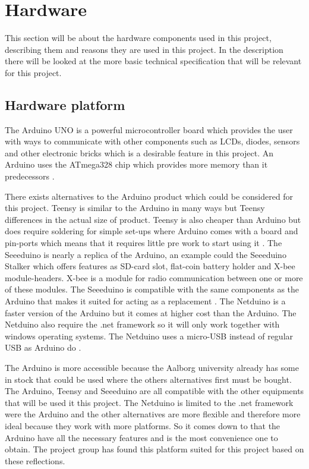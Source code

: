 \section{Hardware}
This section will be about the hardware components used in this project, describing them and reasons they are used in this project. In the description there will be looked at the more basic technical specification that will be relevant for this project.

\subsection{Hardware platform}
The Arduino UNO is a powerful microcontroller board which provides the user with ways to communicate with other components such as LCDs, diodes, sensors and other electronic bricks which is a desirable feature in this project. An Arduino uses the ATmega328 chip which provides more memory than it predecessors \citep{ArduinoUno}.

There exists alternatives to the Arduino product which could be considered for this project. Teensy is similar to the Arduino in many ways but Teensy differences in the actual size of product. Teensy is also cheaper than Arduino but does require soldering for simple set-ups where Arduino comes with a board and pin-ports which means that it requires little pre work to start using it \citep{Teensy}.
The Seeeduino is nearly a replica of the Arduino, an example could the Seeeduino Stalker which offers features as SD-card slot, flat-coin battery holder and X-bee module-headers. X-bee is a module for radio communication between one or more of these modules. The Seeeduino is compatible with the same components as the Arduino that makes it suited for acting as a replacement \citep{Seedui}.
The Netduino is a faster version of the Arduino but it comes at higher cost than the Arduino. The Netduino also require the .net framework so it will only work together with windows operating systems. The Netduino uses a micro-USB instead of regular USB as Arduino do \citep{Netdui}.

The Arduino is more accessible because the Aalborg university already has some in stock that could be used where the others alternatives first must be bought. The Arduino, Teensy and Seeeduino are all compatible with the other equipments that will be used it this project. The Netduino is limited to the .net framework were the Arduino and the other alternatives are more flexible and therefore more ideal because they work with more platforms.
So it comes down to that the Arduino have all the necessary features and is the most convenience one to obtain. The project group has found this platform suited for this project based on these reflections. 

